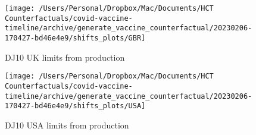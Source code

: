 \documentclass[
]{article}
\begin{document}
\begin{figure}

{\centering \texttt{[image: /Users/Personal/Dropbox/Mac/Documents/HCT Counterfactuals/covid-vaccine-timeline/archive/generate\_vaccine\_counterfactual/20230206-170427-bd46e4e9/shifts\_plots/GBR]} 

}

\caption{DJ10 UK limits from production}\label{fig:GBR-prod-cap}
\end{figure}
\begin{figure}

{\centering \texttt{[image: /Users/Personal/Dropbox/Mac/Documents/HCT Counterfactuals/covid-vaccine-timeline/archive/generate\_vaccine\_counterfactual/20230206-170427-bd46e4e9/shifts\_plots/USA]} 

}

\caption{DJ10 USA limits from production}\label{fig:USA-prod-cap}
\end{figure}
\end{document}
